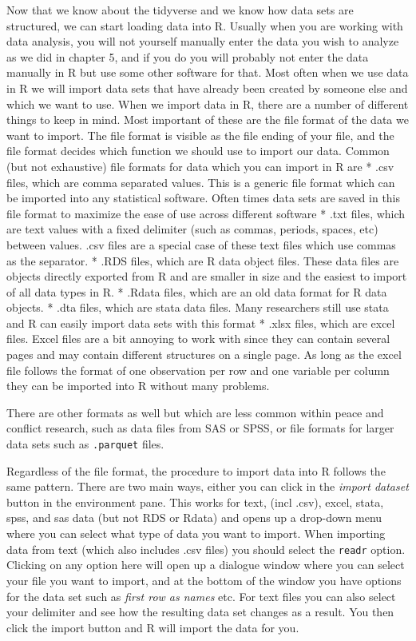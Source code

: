 \documentclass[
]{book}
\begin{document}
Now that we know about the tidyverse and we know how data sets are structured, we can start loading data into R. Usually when you are working with data analysis, you will not yourself manually enter the data you wish to analyze as we did in chapter 5, and if you do you will probably not enter the data manually in R but use some other software for that. Most often when we use data in R we will import data sets that have already been created by someone else and which we want to use. When we import data in R, there are a number of different things to keep in mind. Most important of these are the file format of the data we want to import. The file format is visible as the file ending of your file, and the file format decides which function we should use to import our data. Common (but not exhaustive) file formats for data which you can import in R are
* .csv files, which are comma separated values. This is a generic file format which can be imported into any statistical software. Often times data sets are saved in this file format to maximize the ease of use across different software
* .txt files, which are text values with a fixed delimiter (such as commas, periods, spaces, etc) between values. .csv files are a special case of these text files which use commas as the separator.
* .RDS files, which are R data object files. These data files are objects directly exported from R and are smaller in size and the easiest to import of all data types in R.
* .Rdata files, which are an old data format for R data objects.
* .dta files, which are stata data files. Many researchers still use stata and R can easily import data sets with this format
* .xlsx files, which are excel files. Excel files are a bit annoying to work with since they can contain several pages and may contain different structures on a single page. As long as the excel file follows the format of one observation per row and one variable per column they can be imported into R without many problems.

There are other formats as well but which are less common within peace and conflict research, such as data files from SAS or SPSS, or file formats for larger data sets such as \texttt{.parquet} files.

Regardless of the file format, the procedure to import data into R follows the same pattern. There are two main ways, either you can click in the \emph{import dataset} button in the environment pane. This works for text, (incl .csv), excel, stata, spss, and sas data (but not RDS or Rdata) and opens up a drop-down menu where you can select what type of data you want to import. When importing data from text (which also includes .csv files) you should select the \texttt{readr} option. Clicking on any option here will open up a dialogue window where you can select your file you want to import, and at the bottom of the window you have options for the data set such as \emph{first row as names} etc. For text files you can also select your delimiter and see how the resulting data set changes as a result. You then click the import button and R will import the data for you.
\end{document}
